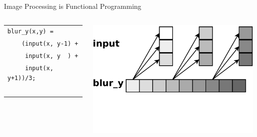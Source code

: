 \documentclass[xcolor=dvipsnames]{beamer}
\begin{document}

\begin{frame}{Image Processing is Functional Programming}
	\begin{columns}

	\begin{tabular}{l}
		\texttt{blur\_y(x,y) =} \\
		\texttt{~~~~(input(x, y-1) +}\\
		\texttt{~~~~~input(x, y~~) +}\\
		\texttt{~~~~~input(x, y+1))/3;}\\
		\\
		\\
		\\
		\\
		\\
	\end{tabular}

	\includegraphics[width=\textwidth]{blury.pdf}
	\end{columns}
\end{frame}
\end{document}
